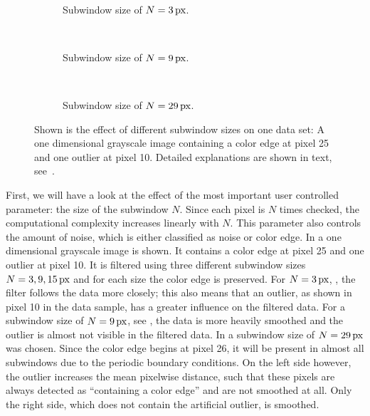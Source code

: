 \begin{figure}[]
  \centering
  \begin{subfigure}[]{\textwidth}
    \centering
    
  \end{subfigure}\vspace{0.25cm}\\
  \begin{subfigure}[]{\textwidth}
    \centering
    
    \caption{Subwindow size of $N = \unit[3]{px}$.}
    \label{fig:sensor_experiments_subwindowsize_3}
  \end{subfigure}\\
  \begin{subfigure}[]{\textwidth}
    \centering
    
    \caption{Subwindow size of $N = \unit[9]{px}$.}
    \label{fig:sensor_experiments_subwindowsize_9}
  \end{subfigure}\\
  \begin{subfigure}[]{\textwidth}
    \centering
    
    \caption{Subwindow size of $N = \unit[29]{px}$.}
    \label{fig:sensor_experiments_subwindowsize_29}
  \end{subfigure}
  \caption{Shown is the effect of different subwindow sizes on one data set: A one dimensional grayscale image containing a color edge at pixel 25 and one outlier at pixel 10. Detailed explanations are shown in text, see~.}
  \label{fig:sensor_experiments_subwindowsize}
\end{figure}

First, we will have a look at the effect of the most important user controlled parameter: the size of the subwindow $N$. 
Since each pixel is $N$ times checked, the computational complexity increases linearly with $N$. 
This parameter also controls the amount of noise, which is either classified as noise or color edge. 
In  a one dimensional grayscale image is shown.
It contains a color edge at pixel 25 and one outlier at pixel 10.
It is filtered using three different subwindow sizes $N = \unit[3,9,15]{px}$ and for each size the color edge is preserved. 
For $N = \unit[3]{px}$, ,  the filter follows the data more closely; this also means that an outlier, as shown in pixel 10 in the data sample, has a greater influence on the filtered data. 
For a subwindow size of $N = \unit[9]{px}$, see , the data is more heavily smoothed and the outlier is almost not visible in the filtered data. 
In  a subwindow size of $N = \unit[29]{px}$ was chosen. 
Since the color edge begins at pixel 26, it will be present in almost all subwindows due to the periodic boundary conditions. 
On the left side however, the outlier increases the mean pixelwise distance, such that these pixels are always detected as ``containing a color edge'' and are not smoothed at all.
Only the right side, which does not contain the artificial outlier, is smoothed.

